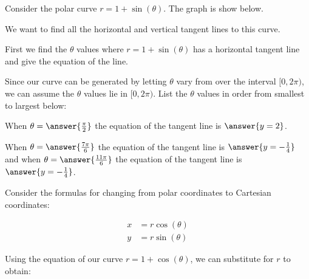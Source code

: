 \documentclass{ximera}
\author{Jason Miller}
\begin{document}
\begin{exercise}


Consider the polar curve $r=1+\sin(\theta)$. The graph is show below. 




\begin{image}  
\end{image} 

We want to find all the horizontal and vertical tangent lines to this curve.

First we find the $\theta$ values where $r=1+\sin(\theta)$ has a horizontal tangent line and give the equation of the line. 

Since our curve can be generated by letting $\theta$ vary from over the interval $[0, 2\pi)$, we can assume the $\theta$ values lie in $[0, 2\pi)$. List the $\theta$ values in order from smallest to largest below: 


When $\theta=\answer{\frac{\pi}{2}}$ the equation of the tangent line is $\answer{y=2  }$.

When $\theta=\answer{\frac{7\pi}{6}}$ the equation of the tangent line is $\answer{y=-\frac{1}{4}}$ and when $\theta=\answer{ \frac{11\pi}{6}}$ the equation of 
the tangent line is $\answer{ y=-\frac{1}{4}}$. 




\begin{hint}

Consider the formulas for changing from polar coordinates to Cartesian coordinates:

\begin{align*}
x&=r\cos(\theta) \\
y&=r\sin(\theta)
\end{align*}

Using the equation of our curve $r=1+\cos(\theta)$, we can substitute for $r$ to obtain:


\end{hint}
\end{exercise}
\end{document}
